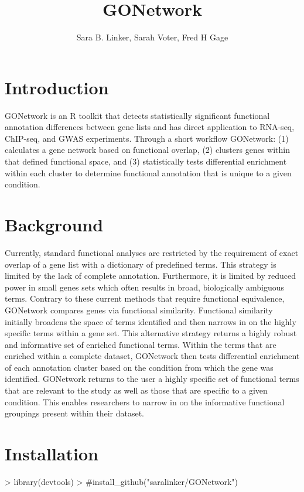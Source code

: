 \documentclass{article}
\title{GONetwork}
\author{Sara B. Linker, Sarah Voter, Fred H Gage}
\begin{document}
\maketitle


\section*{Introduction}
GONetwork is an R toolkit that detects statistically significant functional annotation differences between gene lists and has direct application to RNA-seq, ChIP-seq, and GWAS experiments. Through a short workflow GONetwork: (1) calculates a gene network based on functional overlap, (2) clusters genes within that defined functional space, and (3) statistically tests differential enrichment within each cluster to determine functional annotation that is unique to a given condition.


 \section*{Background}
Currently, standard functional analyses are restricted by the requirement of exact overlap of a gene list with a dictionary of predefined terms. This strategy is limited by the lack of complete annotation. Furthermore, it is limited by reduced power in small genes sets which often results in broad, biologically ambiguous terms. Contrary to these current methods that require functional equivalence, GONetwork compares genes via functional similarity. Functional similarity initially broadens the space of terms identified and then narrows in on the highly specific terms within a gene set. This alternative strategy returns a highly robust and informative set of enriched functional terms. Within the terms that are enriched within a complete dataset, GONetwork then tests differential enrichment of each annotation cluster based on the condition from which the gene was identified. GONetwork returns to the user a highly specific set of functional terms that are relevant to the study as well as those that are specific to a given condition. This enables researchers to narrow in on the informative functional groupings present within their dataset.


\section*{Installation}
\begin{Schunk}
\begin{Sinput}
> library(devtools)
> #install_github("saralinker/GONetwork")
\end{Sinput}
\end{Schunk}
\end{document}
